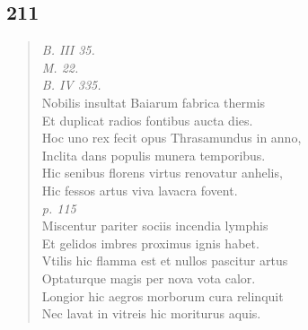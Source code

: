 \documentclass[11pt, a4paper]{report}
\begin{document}
            \subsection*{211}
      \begin{verse}
      \textit{B. III 35.} \\ \textit{M. 22.} \\ \textit{B. IV 335.} \\ Nobilis insultat Baiarum fabrica thermis \\ Et duplicat radios fontibus aucta dies. \\ Hoc uno rex fecit opus Thrasamundus in anno, \\ Inclita dans populis munera temporibus. \\ Hic senibus florens virtus renovatur anhelis, \\ Hic fessos artus viva lavacra fovent. \\ \textit{p. 115} \\ Miscentur pariter sociis incendia lymphis \\ Et gelidos imbres proximus ignis habet. \\ Vtilis hic flamma est et nullos pascitur artus \\ Optaturque magis per nova vota calor. \\ Longior hic aegros morborum cura relinquit \\ Nec lavat in vitreis hic moriturus aquis. \\ 
      \end{verse}
  
\end{document}
